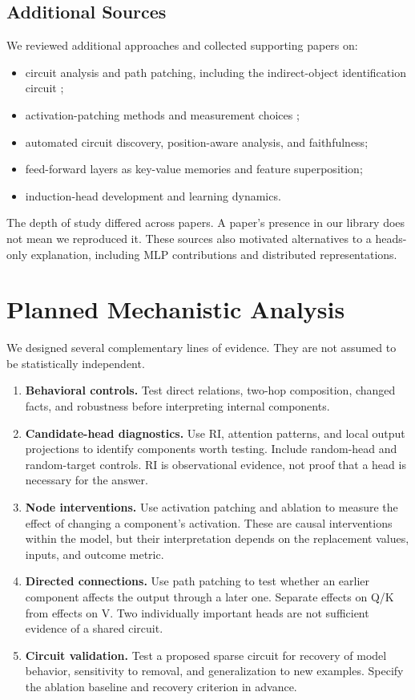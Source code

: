 \documentclass[11pt,a4paper]{article}
\begin{document}
\subsection{Additional Sources}
We reviewed additional approaches and collected supporting papers on:
\begin{itemize}
\item circuit analysis and path patching, including the indirect-object identification circuit \cite{ioi};
\item activation-patching methods and measurement choices \cite{patchguide};
\item automated circuit discovery, position-aware analysis, and faithfulness;
\item feed-forward layers as key-value memories and feature superposition;
\item induction-head development and learning dynamics.
\end{itemize}
The depth of study differed across papers. A paper's presence in our library does not mean we reproduced it. These sources also motivated alternatives to a heads-only explanation, including MLP contributions and distributed representations.

\section{Planned Mechanistic Analysis}
We designed several complementary lines of evidence. They are not assumed to be statistically independent.

\begin{enumerate}
\item \textbf{Behavioral controls.} Test direct relations, two-hop composition, changed facts, and robustness before interpreting internal components.
\item \textbf{Candidate-head diagnostics.} Use RI, attention patterns, and local output projections to identify components worth testing. Include random-head and random-target controls. RI is observational evidence, not proof that a head is necessary for the answer.
\item \textbf{Node interventions.} Use activation patching and ablation to measure the effect of changing a component's activation. These are causal interventions within the model, but their interpretation depends on the replacement values, inputs, and outcome metric.
\item \textbf{Directed connections.} Use path patching to test whether an earlier component affects the output through a later one. Separate effects on Q/K from effects on V. Two individually important heads are not sufficient evidence of a shared circuit.
\item \textbf{Circuit validation.} Test a proposed sparse circuit for recovery of model behavior, sensitivity to removal, and generalization to new examples. Specify the ablation baseline and recovery criterion in advance.
\end{enumerate}
\end{document}

